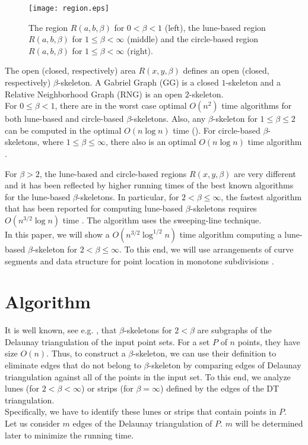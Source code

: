 \documentclass[10pt]{article}
\begin{document}
\begin{figure}[hbt]
\begin{center}
\texttt{[image: region.eps]}
\caption{ The region $R(a,b, \beta)$ for $ 0 < \beta < 1$ (left), the lune-based region 
$R(a,b, \beta)$ for $1 \leq \beta < \infty$ (middle) and the circle-based region $R(a,b, \beta)$
for $1 \leq \beta < \infty$ (right).  }
\label{fig:1}
\end{center}
\end{figure}


The open (closed, respectively) area $R(x,y, \beta)$ defines an open (closed, respectively) $\beta$-skeleton. 
A Gabriel Graph (GG) \cite{gs69} is a closed $1$-skeleton and a Relative Neighborhood Graph (RNG) 
\cite{t80}  is an open $2$-skeleton. \\




For $0 \leq \beta < 1$, there are in the worst case optimal $O(n^2)$ time algorithms \cite{hlm03} 
for both lune-based and circle-based 
$\beta$-skeletons.  Also, any $\beta$-skeleton for $1 \leq \beta \leq 2$ 
can be computed in the optimal $O(n \log n)$ time (\cite{jky89,l94,ms80,s83}). 
For circle-based 
$\beta$-skeletons, where $1 \leq \beta \leq \infty$, there also is an optimal $O(n \log n)$ time 
algorithm \cite{kr85}. 

For $\beta > 2$, the lune-based and circle-based regions $R(x, y, \beta)$ are
very different and it has been reflected by higher running times
of the best known algorithms for the lune-based $\beta$-skeletons.
In particular, for $2 < \beta \leq \infty$, the fastest algorithm that 
has been reported for computing 
lune-based $\beta$-skeletons requires $O(n^{3/2} \log {n})$ time \cite{rm97}.
The algorithm uses  the sweeping-line technique. \\
In this paper, we will show a $O(n^{3/2} \log^{1/2} n)$ 
time algorithm computing a lune-based 
$\beta$-skeleton for  $2 < \beta \leq \infty$. To this end, we will use 
arrangements of curve segments \cite{agr00} and data structure for point location
in monotone subdivisions \cite{egs86}. 

\section{Algorithm}

It is well known, see e.g. \cite{kr85}, that $\beta$-skeletons for $2 < \beta$ are subgraphs 
of the Delaunay triangulation of the input point sets. For a set $P$ of $n$ points,  they have size $O(n)$. 
Thus, to construct a $\beta$-skeleton, we can use their definition to eliminate edges that do not belong 
to $\beta$-skeleton by comparing edges of Delaunay triangulation against all of the points in the input set. 
To this end, we analyze lunes (for $2 < \beta < \infty$) 
or strips (for $\beta = \infty$) defined by the edges of the DT triangulation. \\
Specifically, we have to identify these lunes or strips that contain points
in $P$. \\
Let us consider $m$ edges of the Delaunay triangulation of $P$. 
$m$ will be determined later to minimize the running time. \\
\end{document}
